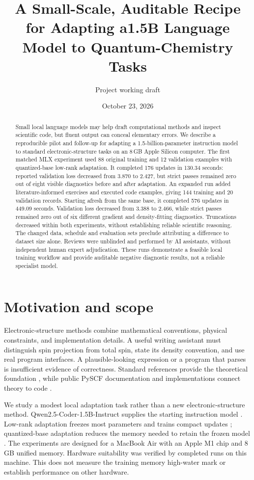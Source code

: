\documentclass[11pt]{article}
\title{A Small-Scale, Auditable Recipe for Adapting a\newline 1.5B Language Model to Quantum-Chemistry Tasks}
\author{Project working draft}
\date{October 23, 2026}
\begin{document}
\maketitle
\begin{abstract}
Small local language models may help draft computational methods and inspect
scientific code, but fluent output can conceal elementary errors. We describe
a reproducible pilot and follow-up for adapting a 1.5-billion-parameter instruction model to
standard electronic-structure tasks on an 8\,GB Apple Silicon computer. The
first matched MLX experiment used 88 original training and 12 validation
examples with quantized-base low-rank adaptation. It completed 176 updates
in 130.34 seconds: reported validation loss decreased from 3.870 to 2.427,
but strict passes remained zero out of eight visible diagnostics before
and after adaptation. An expanded run added literature-informed exercises
and executed code examples, giving 144 training and 20 validation records.
Starting afresh from the same base, it completed 576 updates in 449.09
seconds. Validation loss decreased from 3.388 to 2.466, while strict passes
remained zero out of six different gradient and density-fitting diagnostics.
Truncations decreased within both experiments, without establishing reliable
scientific reasoning. The changed data, schedule and evaluation sets preclude
attributing a difference to dataset size alone. Reviews were unblinded and
performed by AI assistants, without independent human expert adjudication.
These runs demonstrate a feasible local training workflow and provide
auditable negative diagnostic results, not a reliable specialist model.
\end{abstract}

\section{Motivation and scope}
Electronic-structure methods combine mathematical conventions, physical
constraints, and implementation details. A useful writing assistant must
distinguish spin projection from total spin, state its density convention,
and use real program interfaces. A plausible-looking expression or a program
that parses is insufficient evidence of correctness. Standard references
provide the theoretical foundation \cite{helgaker}, while public PySCF
documentation and implementations connect theory to code \cite{pyscf,sun}.

We study a modest local adaptation task rather than a new electronic-structure
method. Qwen2.5-Coder-1.5B-Instruct supplies the starting instruction model
\cite{qwen}. Low-rank adaptation freezes most parameters and trains compact
updates \cite{lora}; quantized-base adaptation reduces the memory needed to
retain the frozen model \cite{qlora}. The experiments are designed for a
MacBook Air with an Apple M1 chip and 8\,GB unified memory. Hardware suitability
was verified by completed runs on this machine. This does not measure the
training memory high-water mark or establish performance on other hardware.
\end{document}
